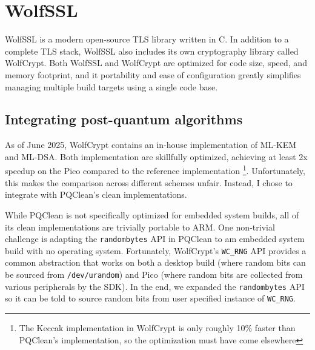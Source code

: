 \documentclass[letterpaper,12pt,titlepage,oneside,final]{book}
\begin{document}
\section{WolfSSL}\label{sec:wolfssl}
WolfSSL is a modern open-source TLS library written in C. In addition to a complete TLS stack, WolfSSL also includes its own cryptography library called WolfCrypt. Both WolfSSL and WolfCrypt are optimized for code size, speed, and memory footprint, and it portability and ease of configuration greatly simplifies managing multiple build targets using a single code base.

\subsection{Integrating post-quantum algorithms}\label{sec:integrating-post-quantum-algorithms}
As of June 2025, WolfCrypt contains an in-house implementation of ML-KEM and ML-DSA. Both implementation are skillfully optimized, achieving at least 2x speedup on the Pico compared to the reference implementation \footnote{The Keccak implementation in WolfCrypt is only roughly 10\% faster than PQClean's implementation, so the optimization must have come elsewhere}. Unfortunately, this makes the comparison across different schemes unfair. Instead, I chose to integrate with PQClean's clean implementations.

While PQClean is not specifically optimized for embedded system builds, all of its clean implementations are trivially portable to ARM. One non-trivial challenge is adapting the \texttt{randombytes} API in PQClean to am embedded system build with no operating system. Fortunately, WolfCrypt's \texttt{WC\_RNG} API provides a common abstraction that works on both a desktop build (where random bits can be sourced from \texttt{/dev/urandom}) and Pico (where random bits are collected from various peripherals by the SDK). In the end, we expanded the \texttt{randombytes} API so it can be told to source random bits from user specified instance of \texttt{WC\_RNG}.



\end{document}
